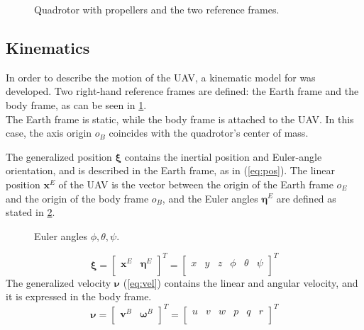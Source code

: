 \documentclass[journal]{IEEEtran}
\begin{document}
	\begin{figure}[h]
		\centering
		
		\caption{Quadrotor with propellers and the two reference frames.}
		\label{fig:frames_rotors}
	\end{figure}
	
	\subsection{Kinematics}
	In order to describe the motion of the UAV, a kinematic model for was developed.
	Two right-hand reference frames are defined: the Earth frame and the body frame, as can be seen in \figurename{ {}\ref{fig:frames_rotors}}. \\

	The Earth frame is static, while the body frame is attached to the UAV. In this case, the axis origin $o_B$ coincides with the quadrotor's center of mass.

	The generalized position $\bm{\xi}$ contains the inertial position and Euler-angle orientation, and is described in the Earth frame, as in (\ref{eq:pos}). The linear position $\bm{x}^E$ of the UAV is the vector between the origin of the Earth frame $o_E$ and the origin of the body frame $o_B$, and the Euler angles $\bm{\eta}^E$ are defined as stated in \figurename{ \ref{fig:roll_pitch_yaw}}.
	
	\begin{figure}[h]
		\centering
		
		
		
		\caption{Euler angles $\phi, \theta, \psi$.}
		\label{fig:roll_pitch_yaw}
	\end{figure}

	\begin{equation} \label{eq:pos}
	\bm{\xi} = \left[ \begin{array}{cc}
	\bm{x}^E & \bm{\eta}^E \\
	\end{array}\right]^T = \left[ \begin{array}{cccccc}
	x & y & z & \phi & \theta & \psi\\
	\end{array}\right] ^T
	\end{equation}  
	The generalized velocity $\bm{\nu}$ (\ref{eq:vel}) contains the linear and angular velocity, and it is expressed in the body frame.
	\begin{equation} \label{eq:vel}
	\bm{\nu} = \left[ \begin{array}{cc}
	\bm{v}^B & \bm{\omega}^B \\
	\end{array}\right]^T = \left[ \begin{array}{cccccc}
	u & v & w & p & q & r\\
	\end{array}\right] ^T 
	\end{equation}
	
\end{document}
